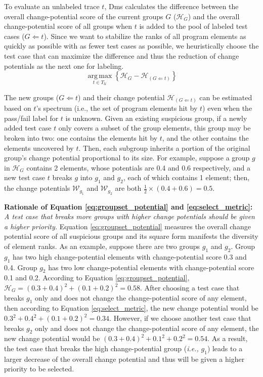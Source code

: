 To evaluate an unlabeled trace $t$, {\sc Dms} calculates the difference between the overall change-potential score of the current groups $G$ ($\mathcal{H}_G$) and the overall change-potential score of all groups when $t$ is added to the pool of labeled test cases ($G \Leftarrow t$).
Since we want to stabilize the ranks of all program elements as quickly as possible with as fewer test cases as possible, we heuristically choose the test case that can maximize the difference and thus the reduction of change potentials as the next one for labeling.
\begin{equation}
	\operatorname*{arg\,max}_{t \in T_\mathcal{U}} \left\{ \mathcal{H}_G - \mathcal{H}_{(G \Leftarrow t)} \right\}\label{eq:select_metric}
\end{equation}

The new groups ($G \Leftarrow t$) and their change potential $\mathcal{H}_{(G \Leftarrow t)}$ can be estimated based on $t$'s spectrum (i.e., the set of program elements hit by $t$) even when the pass/fail label for $t$ is unknown. Given an existing suspicious group, if a newly added test case $t$ only covers a subset of the group elements, this group may be broken into two: one contains the elements hit by $t$, and the other contains the elements uncovered by $t$. Then, each subgroup inherits a portion of the original group's change potential proportional to its size. For example, suppose a group $g$ in $\mathcal{H}_{G}$ contains 2 elements, whose potentials are 0.4 and 0.6 respectively, and a new test case $t$ breaks $g$ into $g_{1}$ and $g_{2}$, each of which contains 1 element; then, the change potentials $\mathcal{W}_{g_1}$ and $\mathcal{W}_{g_2}$ are both $\frac{1}{2}\times(0.4+0.6) = 0.5$.

\noindent\textbf{Rationale of Equation \ref{eq:groupset_potential} and \ref{eq:select_metric}:} \textit{A test case that breaks more groups with higher change potentials should be given a higher priority.}
Equation \ref{eq:groupset_potential} measures the overall change potential score of all suspicious groups and its square form manifests the diversity of element ranks.
As an example, suppose there are two groups $g_{1}$ and $g_{2}$. Group $g_1$ has two high change-potential elements with change-potential score 0.3 and 0.4.
Group $g_{2}$ has two low change-potential elements with change-potential score 0.1 and 0.2.
According to Equation \ref{eq:groupset_potential}, $\mathcal{H}_G = (0.3+0.4)^{2} + (0.1 + 0.2)^2 = 0.58$. After choosing a test case that breaks $g_1$ only and does not change the change-potential score of any element, then according to Equation \ref{eq:select_metric}, the new change potential would be $0.3^{2} + 0.4^{2} + (0.1 + 0.2)^2 = 0.34$. However, if we choose another test case that breaks $g_{2}$ only and does not change the change-potential score of any element, the new change potential would be $ (0.3+0.4)^{2} + 0.1^{2} + 0.2^{2} = 0.54$. As a result, the test case that breaks the high change-potential group (\textit{i.e.,} $g_{1}$) leads to a larger decrease of the overall change potential and thus will be given a higher priority to be selected.

